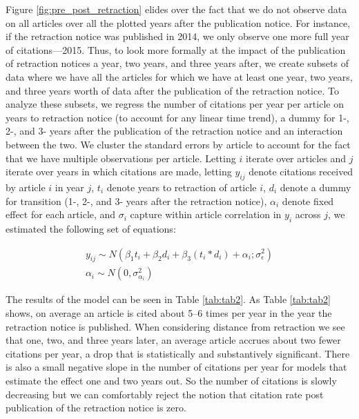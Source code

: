 \documentclass[12pt, letterpaper]{article}
\begin{document}
Figure \ref{fig:pre_post_retraction} elides over the fact that we do not observe data on all articles over all the plotted years after the publication notice. For instance, if the retraction notice was published in 2014, we only observe one more full year of citations---2015. Thus, to look more formally at the impact of the publication of retraction notices a year, two years, and three years after, we create subsets of data where we have all the articles for which we have at least one year, two years, and three years worth of data after the publication of the retraction notice. To analyze these subsets, we regress the number of citations per year per article on years to retraction notice (to account for any linear time trend), a dummy for 1-, 2-, and 3- years after the publication of the retraction notice and an interaction between the two. We cluster the standard errors by article to account for the fact that we have multiple observations per article. Letting $i$ iterate over articles and $j$ iterate over years in which citations are made, letting $y_{ij}$ denote citations received by article $i$ in year $j$, $t_i$ denote years to retraction of article $i$, $d_i$ denote a dummy for transition (1-, 2-, and 3- years after the retraction notice), $\alpha_i$ denote fixed effect for each article, and $\sigma_i$ capture within article correlation in $y_i$ across $j$, we estimated the following set of equations:

\begin{align}
\label{eqn:eqn1}
y_{ij} \sim N(\beta_1 t_i+ \beta_2 d_i + \beta_3 (t_i * d_i) + \alpha_i; \sigma^2_{\epsilon})\\ \nonumber
\alpha_i \sim N(0, \sigma^2_{\alpha_i})
\end{align}

The results of the model can be seen in Table \ref{tab:tab2}. As Table \ref{tab:tab2} shows, on average an article is cited about 5--6 times per year in the year the retraction notice is published. When considering distance from retraction we see that one, two, and three years later, an average article accrues about two fewer citations per year, a drop that is statistically and substantively significant. There is also a small negative slope in the number of citations per year for models that estimate the effect one and two years out. So the number of citations is slowly decreasing but we can comfortably reject the notion that citation rate post publication of the retraction notice is zero.


\end{document}
